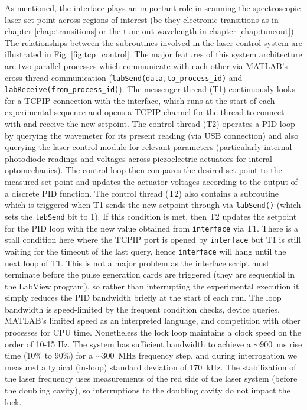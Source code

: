 	As mentioned, the interface plays an important role in scanning the spectroscopic laser set point across regions of interest (be they electronic transitions as in chapter \ref{chap:transitions} or the tune-out wavelength in chapter \ref{chap:tuneout}). 
	The relationships between the subroutines involved in the laser control system are illustrated in Fig. \ref{fig:tcp_control}.
	The major features of this system architecture are two parallel processes which communicate with each other via MATLAB's cross-thread communication (\verb|labSend(data,to_process_id)| and \verb|labReceive(from_process_id)|).
	The messenger thread (T1) continuously looks for a TCPIP connection with the interface, which runs at the start of each experimental sequence and opens a TCPIP channel for the thread to connect with and receive the new setpoint.
	The control thread (T2) operates a PID loop by querying the wavemeter for its present reading (via USB connection) and also querying the laser control module for relevant parameters (particularly internal photodiode readings and voltages across piezoelectric actuators for interal optomechanics).
	The control loop then compares the desired set point to the measured set point and updates the actuator voltages according to the output of a discrete PID function.
	The control thread (T2) also contains a subroutine which is triggered when T1 sends the new setpoint through via \verb|labSend()| (which sets the \verb|labSend| bit to 1).
	If this condition is met, then T2 updates the setpoint for the PID loop with the new value obtained from \verb|interface| via T1.
	There is a stall condition here where the TCPIP port is opened by \verb|interface| but T1 is still waiting for the timeout of the last query, hence \verb|interface| will hang until the next loop of T1.
	This is not a major problem as the interface script must terminate before the pulse generation cards are triggered (they are sequential in the LabView program), so rather than interrupting the experimental execution it simply reduces the PID bandwidth briefly at the start of each run.
	The loop bandwidth is speed-limited by the frequent condition checks, device queries, MATLAB's limited speed as an interpreted language, and competition with other processes for CPU time. 
	Nonetheless the lock loop maintains a clock speed on the order of 10-15 Hz.
	The system has sufficient bandwidth to achieve a $\sim900$~ms rise time (10\% to 90\%) for a $\sim300$~MHz frequency step, and during interrogation we measured a typical (in-loop) standard deviation of 170~kHz. 
	The stabilization of the laser frequency uses measurements of the red side of the laser system (before the doubling cavity), so interruptions to the doubling cavity do not impact the lock.
	

